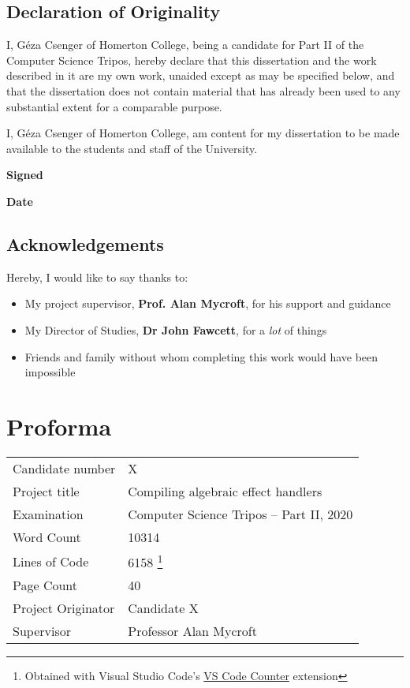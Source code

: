 \documentclass[%
    12pt,
    a4paper,
    bibliography=toc,
    listof=leveldown,%
    oneside
]{book}
\begin{document}


\frontmatter

\section*{Declaration of Originality}

I, Géza Csenger of Homerton College,
being a candidate for Part II of the Computer Science Tripos,
hereby declare that this dissertation and the work described in it
are my own work, unaided except as may be specified below, and
that the dissertation does not contain material that has already
been used to any substantial extent for a comparable purpose.

I, Géza Csenger of Homerton College,
am content for my dissertation to be made available to the students and staff of the University. 

\vspace{1cm}
\textbf{Signed}

\vspace{1cm}
\textbf{Date}

\vspace{3cm}

\section*{Acknowledgements}

Hereby, I would like to say thanks to:
\begin{itemize}
    \item My project supervisor, \textbf{Prof. Alan Mycroft}, for his support and guidance
    \item My Director of Studies, \textbf{Dr John Fawcett}, for a \emph{lot} of things
    \item Friends and family without whom completing this work would have been impossible
\end{itemize}

\newpage

\chapter{Proforma}
\begin{tabularx}{\textwidth}{@{} ll @{}}
Candidate number & X \\
Project title & Compiling algebraic effect handlers \\
Examination & Computer Science Tripos -- Part II, 2020 \\
Word Count & 10314 \\
Lines of Code & 6158
\footnote{Obtained with Visual Studio Code's \href{https://marketplace.visualstudio.com/items?itemName=uctakeoff.vscode-counter}{VS Code Counter} extension} \\
Page Count & 40 \\
Project Originator & Candidate X \\
Supervisor & Professor Alan Mycroft \\
\end{tabularx}
\end{document}
